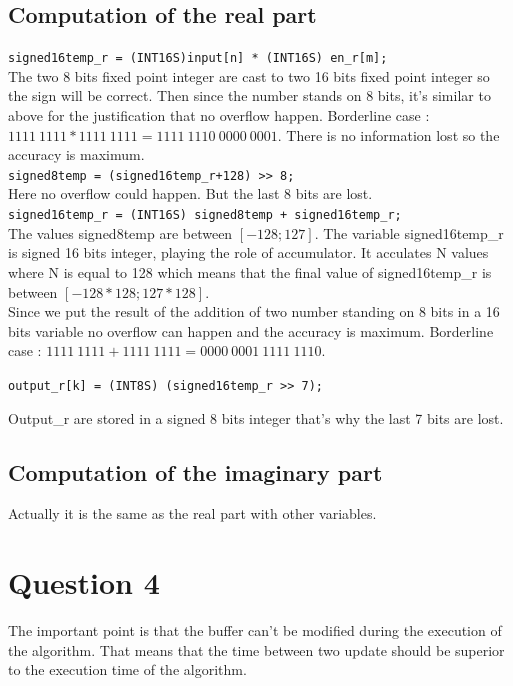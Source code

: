 \documentclass[a4paper]{article}
\begin{document}
\subsection{Computation of the real part}

\verb|signed16temp_r = (INT16S)input[n] * (INT16S) en_r[m];|
\\
The two 8 bits fixed point integer are cast to two 16 bits fixed point integer so the sign will be correct.
Then since the number stands on 8 bits, it's similar to above for the justification that no overflow happen. Borderline case :   $ 1111\ 1111 * 1111\ 1111 = 1111\ 1110\ 0000\ 0001 $. There is no information lost so the accuracy is maximum.
\\
\verb|signed8temp = (signed16temp_r+128) >> 8;|
\\
Here no overflow could happen. But the last 8 bits are lost.
\\
\verb|signed16temp_r = (INT16S) signed8temp + signed16temp_r;|
\\
The values signed8temp are between $[-128;127]$. The variable signed16temp\_r is signed 16 bits integer, playing the role of accumulator. It acculates N values where N is equal to 128 which means that the final value of signed16temp\_r is between $[-128*128;127*128]$.
\\
Since we put the result of the addition of two number standing on 8 bits in a 16 bits variable no overflow can happen and the accuracy is maximum. Borderline case : $ 1111\ 1111 + 1111\ 1111 = 0000\ 0001\ 1111\ 1110 $.

\verb|output_r[k] = (INT8S) (signed16temp_r >> 7);|

 Output\_r are stored in a signed 8 bits integer that's why the last 7 bits are lost.


\subsection{Computation of the imaginary part}

Actually it is the same as the real part with other variables.

\section{Question 4}
The important point is that the buffer can't be modified during the execution of the algorithm. That means that the time between two update should be superior to the execution time of the algorithm.
\end{document}
